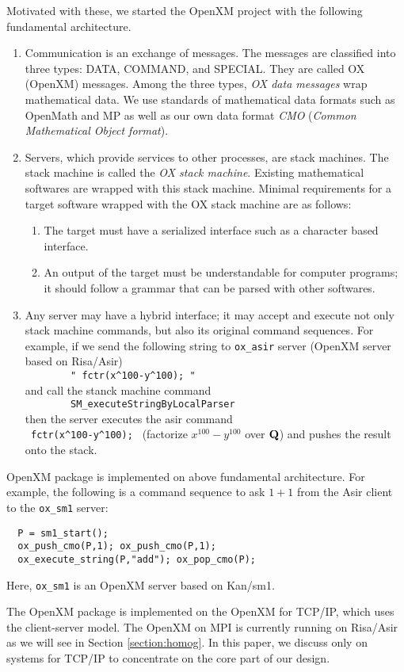 Motivated with these, we started the OpenXM project with the following
fundamental architecture.
\begin{enumerate}
\item Communication is an exchange of messages. The messages are classified into
three types:
DATA, COMMAND, and SPECIAL.
They are called OX (OpenXM) messages.
Among the three types,
{\it OX data messages} wrap mathematical data.
We use standards of mathematical data formats such as OpenMath and MP
as well as our own data format {\it CMO}
({\it Common Mathematical Object format}).
\item Servers, which provide services to other processes, are stack machines.
The stack machine is called the
{\it OX stack machine}.
Existing mathematical softwares are wrapped with this stack machine.
Minimal requirements for a target software wrapped with the OX stack machine
are as follows:
\begin{enumerate}
\item The target must have a serialized interface such as a character based
interface.
\item An output of the target must be understandable for computer programs;
it should follow a grammar that can be parsed with other softwares.
\end{enumerate}
\item Any server may have a hybrid interface;
it may accept and execute not only stack machine commands, 
but also its original command sequences.
For example,
if we send the following string to {\tt ox\_asir} server 
(OpenXM server based on Risa/Asir) \\
\verb+        " fctr(x^100-y^100); "      + \\
and call the stanck machine command  \\
\verb+        SM_executeStringByLocalParser    + \\ 
then the server executes the asir command \\
\verb+ fctr(x^100-y^100); + 
(factorize $x^{100}-y^{100}$ over ${\bf Q}$)
and pushes the result onto the stack.
\end{enumerate}
OpenXM package  is implemented on above fundamental architecture.
For example, the following is a command sequence to ask $1+1$ from
the Asir client to the {\tt ox\_sm1} server:
\begin{verbatim}
  P = sm1_start();
  ox_push_cmo(P,1); ox_push_cmo(P,1);
  ox_execute_string(P,"add"); ox_pop_cmo(P);
\end{verbatim}
Here, {\tt ox\_sm1} is an OpenXM server based on Kan/sm1.

The OpenXM package is implemented on the  OpenXM for TCP/IP, 
which uses the client-server model.
The OpenXM on MPI \cite{MPI} is currently running on Risa/Asir
as we will see in Section \ref{section:homog}.
In this paper, we discuss only on systems for TCP/IP
to concentrate on the core part of our design.






